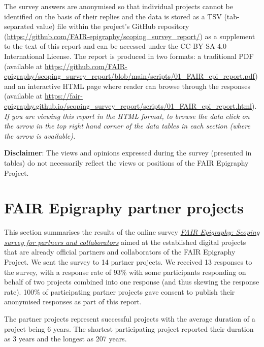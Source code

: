 \documentclass[
  12pt,
]{scrreprt}
\begin{document}
The survey answers are anonymised so that individual projects cannot be
identified on the basis of their replies and the data is stored as a TSV
(tab-separated value) file within the project's GitHub repository
(\url{https://github.com/FAIR-epigraphy/scoping_survey_report/}) as a
supplement to the text of this report and can be accessed under the
CC-BY-SA 4.0 International License. The report is produced in two
formats: a traditional PDF (available at
\url{https://github.com/FAIR-epigraphy/scoping_survey_report/blob/main/scripts/01_FAIR_epi_report.pdf})
and an interactive HTML page where reader can browse through the
responses (available at
\url{https://fair-epigraphy.github.io/scoping_survey_report/scripts/01_FAIR_epi_report.html}).
\emph{If you are viewing this report in the HTML format, to browse the
data click on the arrow in the top right hand corner of the data tables
in each section (where the arrow is available).}

\textbf{Disclaimer}: The views and opinions expressed during the survey
(presented in tables) do not necessarily reflect the views or positions
of the FAIR Epigraphy Project.

\hypertarget{fair-epigraphy-partner-projects}{%
\chapter{FAIR Epigraphy partner
projects}\label{fair-epigraphy-partner-projects}}

\footnotesize

\normalsize

This section summarises the results of the online survey
\href{https://github.com/FAIR-epigraphy/scoping_survey_report/data/01_Survey_partners_questions.pdf}{\emph{FAIR
Epigraphy: Scoping survey for partners and collaborators}} aimed at the
established digital projects that are already official partners and
collaborators of the FAIR Epigraphy Project. We sent the survey to 14
partner projects. We received 13 responses to the survey, with a
response rate of 93\% with some participants responding on behalf of two
projects combined into one response (and thus skewing the response
rate). 100\% of participating partner projects gave consent to publish
their anonymised responses as part of this report.

The partner projects represent successful projects with the average
duration of a project being 6 years. The shortest participating project
reported their duration as 3 years and the longest as 207 years.
\end{document}
